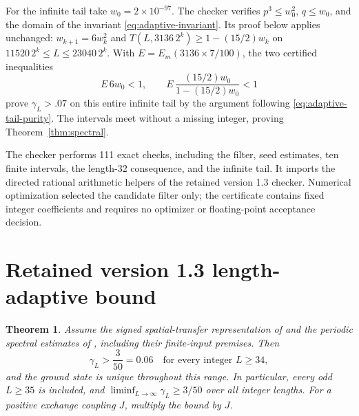 \documentclass[11pt,a4paper]{article}
\newtheorem{theorem}{Theorem}
\newcommand{\gap}{\gamma}
\begin{document}
For the infinite tail take $w_0=2\times10^{-97}$. The checker verifies
$p^3\le w_0^2$, $q\le w_0$, and the domain of the invariant
\eqref{eq:adaptive-invariant}. Its proof below applies unchanged:
$w_{k+1}=6w_k^2$ and
$T(L,3136\,2^k)\ge1-(15/2)w_k$ on
$11520\,2^k\le L\le23040\,2^k$.
With $E=E_m(3136\times7/100)$, the two certified inequalities
\[
 E\,6w_0<1,\qquad E\,\frac{(15/2)w_0}{1-(15/2)w_0}<1
\]
prove $\gap_L>.07$ on this entire infinite tail by the argument
following \eqref{eq:adaptive-tail-purity}. The intervals meet without
a missing integer, proving Theorem~\ref{thm:spectral}.

The checker  performs 111 exact
checks, including the filter, seed estimates, ten finite intervals,
the length-32 consequence, and the infinite tail.
It imports the directed rational arithmetic helpers of the retained
version 1.3 checker. Numerical optimization selected the candidate
filter only; the certificate contains fixed integer coefficients and
requires no optimizer or floating-point acceptance decision.

\section{Retained version 1.3 length-adaptive bound}
\begin{theorem}\label{thm:adaptive}
Assume the signed spatial-transfer representation of
\cite[Proposition 3.1]{upstream} and the periodic spectral estimates
of \cite[Proposition 3.4 and its proof]{boundary}, including their
finite-input premises. Then
\[
 \boxed{\gap_L>\frac{3}{50}=0.06
       \quad\text{for every integer }L\ge34,}
\]
and the ground state is unique throughout this range. In particular,
every odd $L\ge35$ is included, and
$\liminf_{L\to\infty}\gap_L\ge3/50$ over all integer lengths.
For a positive exchange coupling $J$, multiply the bound by $J$.
\end{theorem}
\end{document}
